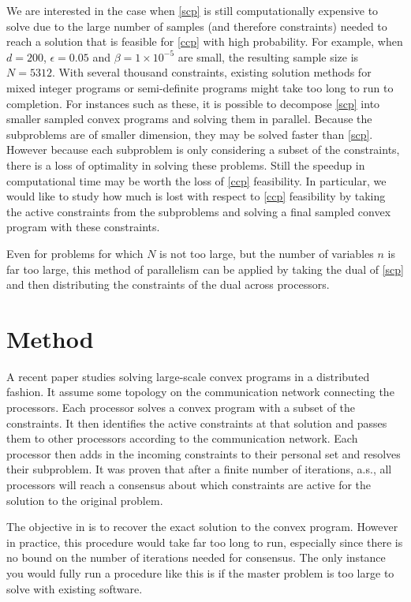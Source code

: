 \documentclass[12pt]{article}
\begin{document}
We are interested in the case when \ref{scp} is still computationally expensive to solve due to the large number of samples (and therefore constraints) needed to reach a solution that is feasible for \ref{ccp} with high probability.
For example, when $d = 200$, $\epsilon = 0.05$ and $\beta = 1 \times 10^{-5}$ are small, the resulting sample size is $N = 5312$.
With several thousand constraints, existing solution methods for mixed integer programs or semi-definite programs might take too long to run to completion.
For instances such as these, it is possible to decompose \ref{scp} into smaller sampled convex programs and solving them in parallel.
Because the subproblems are of smaller dimension, they may be solved faster than \ref{scp}.
However because each subproblem is only considering a subset of the constraints, there is a loss of optimality in solving these problems.
Still the speedup in computational time may be worth the loss of \ref{ccp} feasibility.
In particular, we would like to study how much is lost with respect to \ref{ccp} feasibility by taking the active constraints from the subproblems and solving a final sampled convex program with these constraints.

Even for problems for which $N$ is not too large, but the number of variables $n$ is far too large, this method of parallelism can be applied by taking the dual of \ref{scp} and then distributing the constraints of the dual across processors.

\section*{Method}

A recent paper \cite{carlone2014} studies solving large-scale convex programs in a distributed fashion.
It assume some topology on the communication network connecting the processors.
Each processor solves a convex program with a subset of the constraints.
It then identifies the active constraints at that solution and passes them to other processors according to the communication network.
Each processor then adds in the incoming constraints to their personal set and resolves their subproblem.
It was proven that after a finite number of iterations, a.s., all processors will reach a consensus about which constraints are active for the solution to the original problem.

The objective in \cite{carlone2014} is to recover the exact solution to the convex program.
However in practice, this procedure would take far too long to run, especially since there is no bound on the number of iterations needed for consensus.
The only instance you would fully run a procedure like this is if the master problem is too large to solve with existing software.
\end{document}
